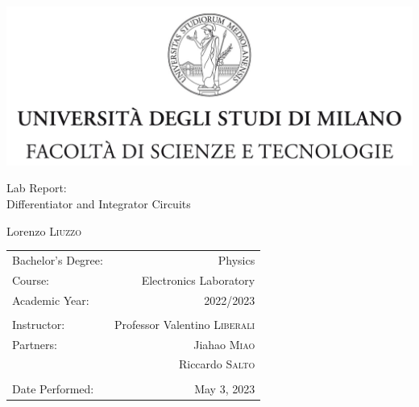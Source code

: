 \documentclass[
	a4paper, %
	10pt, %
]{report}
\begin{document}

		\begin{titlepage}
		\centering
		\vspace{1.5cm} %

			\includegraphics[width=1\textwidth]{figures/unimi.jpg} %

		\vspace{1.5cm}
			
			\Huge Lab Report: \\ Differentiator and Integrator Circuits %
			
		\vspace{1cm}
			
			\Large Lorenzo \textsc{Liuzzo} %
			
		\vspace{2cm}
		
			\begin{tabular}{l r}
			
				Bachelor's Degree: & Physics \\ %
				Course: & Electronics Laboratory \\ %
				Academic Year: & 2022/2023 \\ %
				\\
				Instructor: & Professor Valentino \textsc{Liberali} \\ %
				Partners: & Jiahao \textsc{Miao} \\ & Riccardo \textsc{Salto} \\ %
				\\
				Date Performed: & May 3, 2023 \\ %
				
			\end{tabular}

		\vfill %
		\end{titlepage}
\end{document}
